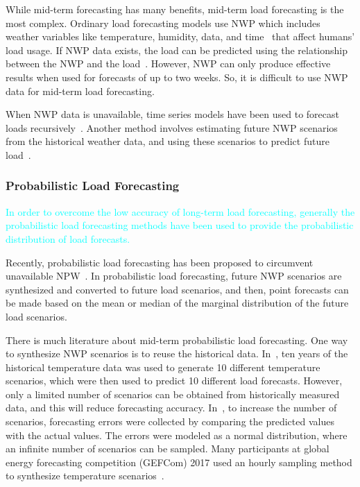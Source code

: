 \documentclass[journal]{IEEEtran} %
\begin{document}
While mid-term forecasting has many benefits, mid-term load forecasting is the most complex. Ordinary load forecasting models use NWP which includes weather variables like temperature, humidity, data, and time~\cite{Xie2016a} that affect humans' load usage. If NWP data exists, the load can be predicted using the relationship between the NWP and the load~\cite{Bacher2013}. However, NWP can only produce effective results when used for forecasts of up to two weeks. So, it is difficult to use NWP data for mid-term load forecasting. 




When NWP data is unavailable, time series models have been used to forecast loads recursively~\cite{Lee2018}. Another method involves estimating future NWP scenarios from the historical weather data, and using these scenarios to predict future load~\cite{Xie2016a}. 







\subsubsection{Probabilistic Load Forecasting}
\textcolor{cyan}{In order to overcome the low accuracy of long-term load forecasting, generally the probabilistic load forecasting methods have been used to provide the probabilistic distribution of load forecasts.}


Recently, probabilistic load forecasting has been proposed to circumvent unavailable NPW~\cite{Xie2016a}. In probabilistic load forecasting, future NWP scenarios are synthesized and converted to future load scenarios, and then, point forecasts can be made based on the mean or median of the marginal distribution of the future load scenarios.







There is much literature about mid-term probabilistic load forecasting. One way to synthesize NWP scenarios is to reuse the historical data. In~\cite{Hong2014}, ten years of the historical temperature data was used to generate 10 different temperature scenarios, which were then used to predict 10 different load forecasts. However, only a limited number of scenarios can be obtained from historically measured data, and this will reduce forecasting accuracy. In~\cite{Xie2017}, to increase the number of scenarios, forecasting errors were collected by comparing the predicted values with the actual values. The errors were modeled as a normal distribution, where an infinite number of scenarios can be sampled.  Many participants at global energy forecasting competition (GEFCom) 2017 used an hourly sampling method to synthesize temperature scenarios~\cite{Hong2019}. 
\end{document}
